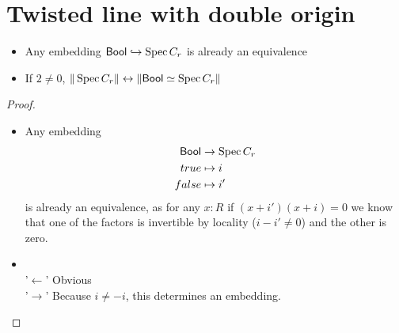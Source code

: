 \documentclass{article}
\newcommand{\Bool}{\mathsf{Bool}}
\begin{document}
\section{Twisted line with double origin}

\begin{lemma}{\label{lemma:BoolSpecC}}

	\begin{itemize}
	
		\item 	Any embedding $\Bool \hookrightarrow \Spec C_r$ is already an equivalence 
		\item 		If $2 \neq 0$, $\| \Spec C_r \| \leftrightarrow \|\Bool \simeq \Spec C_r\|$	\end{itemize}
\end{lemma}
\begin{proof}
	\begin{itemize}
		\item 	Any embedding 
		\begin{align*}
			\Bool &\to \Spec C_r \\
			true &\mapsto i \\
			false &\mapsto i'
		\end{align*}
		is already an equivalence, as for any $x : R$ if $(x+i')(x+i) = 0$ we know that one of the factors is invertible by locality ($i -i'\neq 0$) and the other is zero. 
		\item 	\ \\ '$\leftarrow$' 
		Obvious \\
		'$\rightarrow$'  Because $i \neq -i$, this determines an embedding.
	\end{itemize}

\end{proof}
\end{document}
